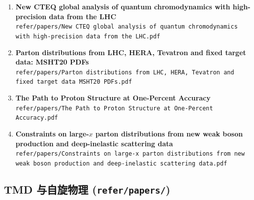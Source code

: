 \documentclass[12pt,a4paper]{ctexart}
\begin{document}
\begin{enumerate}
    \item \textbf{New CTEQ global analysis of quantum chromodynamics with high-precision data from the LHC} \\
    \texttt{refer/papers/New CTEQ global analysis of quantum chromodynamics with high-precision data from the LHC.pdf}

    \item \textbf{Parton distributions from LHC, HERA, Tevatron and fixed target data: MSHT20 PDFs} \\
    \texttt{refer/papers/Parton distributions from LHC, HERA, Tevatron and fixed target data MSHT20 PDFs.pdf}

    \item \textbf{The Path to Proton Structure at One-Percent Accuracy} \\
    \texttt{refer/papers/The Path to Proton Structure at One-Percent Accuracy.pdf}

    \item \textbf{Constraints on large-$x$ parton distributions from new weak boson production and deep-inelastic scattering data} \\
    \texttt{refer/papers/Constraints on large-x parton distributions from new weak boson production and deep-inelastic scattering data.pdf}
\end{enumerate}

\subsection{TMD 与自旋物理 (\texttt{refer/papers/})}
\end{document}
